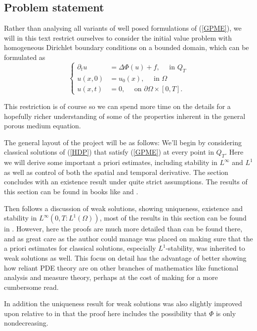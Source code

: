 \documentclass[11pt, a4paper]{article}
\begin{document}
\subsection{Problem statement}
Rather than analysing all variants of well posed formulations of (\ref{GPME}), we will in this text restrict ourselves to consider the initial value problem with homogeneous Dirichlet boundary conditions on a bounded domain, which can be formulated as
\begin{equation}
\label{HDP}
	\begin{cases}
		\partial_t u &= \Delta \Phi(u) + f, \quad \text{ in } Q_T \\
		u(x,0) &= u_0(x), \quad \text{ in } \Omega \\
		u(x,t) &= 0, \quad \text{ on } \partial\Omega \times [0,T].
	\end{cases}
\end{equation}

This restriction is of course so we can spend more time on the details for a hopefully richer understanding of some of the properties inherent in the general porous medium equation.

The general layout of the project will be as follows: We'll begin by considering classical solutions of (\ref{HDP}) that satisfy (\ref{GPME}) at every point in $Q_T$. Here we will derive some important a priori estimates, including stability in $L^\infty$ and $L^1$ as well as control of both the spatial and temporal derivative. The section concludes with an existence result under quite strict assumptions. The results of this section can be found in books like \citep{vazquez2007porous} and \citep{ladyzhenskaya}.

Then follows a discussion of weak solutions, showing uniqueness, existence and stability in $L^\infty(0,T: L^1(\Omega))$, most of the results in this section can be found in \citep[chapter 5]{vazquez2007porous}. However, here the proofs are much more detailed than can be found there, and as great care as the author could manage was placed on making sure that the a priori estimates for classical solutions, especially $L^1$-stability, was inherited to weak solutions as well. This focus on detail has the advantage of better showing how reliant PDE theory are on other branches of mathematics like functional analysis and measure theory, perhaps at the cost of making for a more cumbersome read.

In addition the uniqueness result for weak solutions was also slightly improved upon relative to \citep{vazquez2007porous} in that the proof here includes the possibility that $\Phi$ is only nondecreasing.
\end{document}
